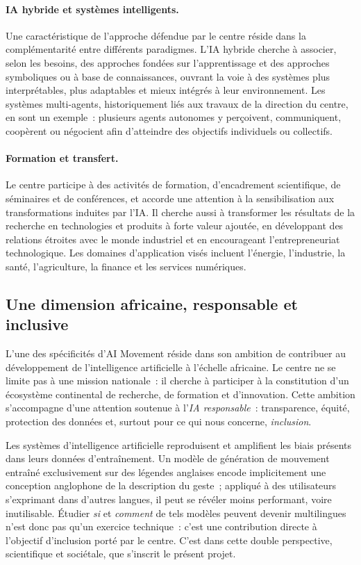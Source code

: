\documentclass[12pt,a4paper,oneside]{report}
\theoremstyle{definition}
\theoremstyle{plain}
\begin{document}
\paragraph{IA hybride et systèmes intelligents.} Une caractéristique de l'approche
défendue par le centre réside dans la complémentarité entre différents paradigmes.
L'IA hybride cherche à associer, selon les besoins, des approches fondées sur
l'apprentissage et des approches symboliques ou à base de connaissances, ouvrant la
voie à des systèmes plus interprétables, plus adaptables et mieux intégrés à leur
environnement. Les systèmes multi-agents, historiquement liés aux travaux de la
direction du centre, en sont un exemple~: plusieurs agents autonomes y perçoivent,
communiquent, coopèrent ou négocient afin d'atteindre des objectifs individuels ou
collectifs.

\paragraph{Formation et transfert.} Le centre participe à des activités de
formation, d'encadrement scientifique, de séminaires et de conférences, et accorde
une attention à la sensibilisation aux transformations induites par l'IA. Il
cherche aussi à transformer les résultats de la recherche en technologies et
produits à forte valeur ajoutée, en développant des relations étroites avec le
monde industriel et en encourageant l'entrepreneuriat technologique. Les domaines
d'application visés incluent l'énergie, l'industrie, la santé, l'agriculture, la
finance et les services numériques.

\subsection{Une dimension africaine, responsable et inclusive}

L'une des spécificités d'AI Movement réside dans son ambition de contribuer au
développement de l'intelligence artificielle à l'échelle africaine. Le centre ne
se limite pas à une mission nationale~: il cherche à participer à la constitution
d'un écosystème continental de recherche, de formation et d'innovation. Cette
ambition s'accompagne d'une attention soutenue à l'\emph{IA responsable}~:
transparence, équité, protection des données et, surtout pour ce qui nous concerne,
\emph{inclusion}.

Les systèmes d'intelligence artificielle reproduisent et amplifient les biais
présents dans leurs données d'entraînement. Un modèle de génération de mouvement
entraîné exclusivement sur des légendes anglaises encode implicitement une
conception anglophone de la description du geste~; appliqué à des utilisateurs
s'exprimant dans d'autres langues, il peut se révéler moins performant, voire
inutilisable. Étudier \emph{si} et \emph{comment} de tels modèles peuvent devenir
multilingues n'est donc pas qu'un exercice technique~: c'est une contribution
directe à l'objectif d'inclusion porté par le centre. C'est dans cette double
perspective, scientifique et sociétale, que s'inscrit le présent projet.
\end{document}

